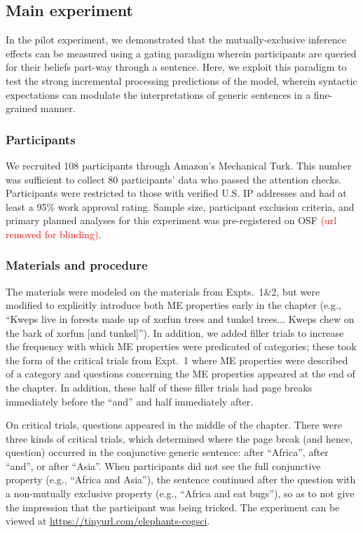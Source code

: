 \documentclass[10pt,letterpaper]{article}
\newcommand{\red}[1]{{\textcolor{Red}{#1}}}
\begin{document}
\subsection{Main experiment}

In the pilot experiment, we demonstrated that the mutually-exclusive inference effects can be measured using a gating paradigm wherein participants are queried for their beliefs part-way through a sentence. 
Here, we exploit this paradigm to test the strong incremental processing predictions of the model, wherein syntactic expectations can modulate the interpretations of generic sentences in a fine-grained manner. 

\subsubsection{Participants}

We recruited 108 participants through Amazon's Mechanical Turk.
This number was sufficient to collect 80 participants' data who passed the attention checks.  
Participants were restricted to those with verified U.S. IP addresses and had at least a 95\% work approval rating. 
Sample size, participant exclusion criteria, and primary planned analyses for this experiment was pre-registered on OSF \red{(url removed for blinding)}.

\subsubsection{Materials and procedure}

The materials were modeled on the materials from Expts.~1\&2, but were modified to explicitly introduce both ME properties early in the chapter (e.g., ``Kweps live in forests made up of xorfun trees and tunkel trees... Kweps chew on the bark of xorfun [and tunkel]'').
In addition, we added filler trials to increase the frequency with which ME properties were predicated of categories; these took the form of the critical trials from Expt.~1 where ME properties were described of a category and questions concerning the ME properties appeared at the end of the chapter. 
In addition, these half of these filler trials had page breaks immediately before the ``and'' and half immediately after.

On critical trials, questions appeared in the middle of the chapter. 
There were three kinds of critical trials, which determined where the page break (and hence, question) occurred in the conjunctive generic sentence: after ``Africa'', after ``and'', or after ``Asia''. 
When participants did not see the full conjunctive property (e.g., ``Africa and Asia''), the sentence continued after the question with a non-mutually exclusive property (e.g., ``Africa and eat bugs''), so as to not give the impression that the participant was being tricked. 
The experiment can be viewed at \url{https://tinyurl.com/elephants-cogsci}.
\end{document}
